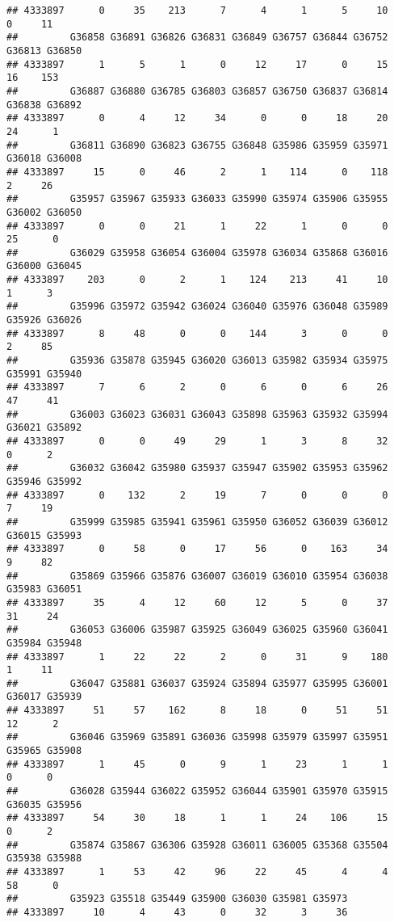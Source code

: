 \documentclass[
]{article}
\begin{document}
\begin{verbatim}
## 4333897      0     35    213      7      4      1      5     10      0     11
##         G36858 G36891 G36826 G36831 G36849 G36757 G36844 G36752 G36813 G36850
## 4333897      1      5      1      0     12     17      0     15     16    153
##         G36887 G36880 G36785 G36803 G36857 G36750 G36837 G36814 G36838 G36892
## 4333897      0      4     12     34      0      0     18     20     24      1
##         G36811 G36890 G36823 G36755 G36848 G35986 G35959 G35971 G36018 G36008
## 4333897     15      0     46      2      1    114      0    118      2     26
##         G35957 G35967 G35933 G36033 G35990 G35974 G35906 G35955 G36002 G36050
## 4333897      0      0     21      1     22      1      0      0     25      0
##         G36029 G35958 G36054 G36004 G35978 G36034 G35868 G36016 G36000 G36045
## 4333897    203      0      2      1    124    213     41     10      1      3
##         G35996 G35972 G35942 G36024 G36040 G35976 G36048 G35989 G35926 G36026
## 4333897      8     48      0      0    144      3      0      0      2     85
##         G35936 G35878 G35945 G36020 G36013 G35982 G35934 G35975 G35991 G35940
## 4333897      7      6      2      0      6      0      6     26     47     41
##         G36003 G36023 G36031 G36043 G35898 G35963 G35932 G35994 G36021 G35892
## 4333897      0      0     49     29      1      3      8     32      0      2
##         G36032 G36042 G35980 G35937 G35947 G35902 G35953 G35962 G35946 G35992
## 4333897      0    132      2     19      7      0      0      0      7     19
##         G35999 G35985 G35941 G35961 G35950 G36052 G36039 G36012 G36015 G35993
## 4333897      0     58      0     17     56      0    163     34      9     82
##         G35869 G35966 G35876 G36007 G36019 G36010 G35954 G36038 G35983 G36051
## 4333897     35      4     12     60     12      5      0     37     31     24
##         G36053 G36006 G35987 G35925 G36049 G36025 G35960 G36041 G35984 G35948
## 4333897      1     22     22      2      0     31      9    180      1     11
##         G36047 G35881 G36037 G35924 G35894 G35977 G35995 G36001 G36017 G35939
## 4333897     51     57    162      8     18      0     51     51     12      2
##         G36046 G35969 G35891 G36036 G35998 G35979 G35997 G35951 G35965 G35908
## 4333897      1     45      0      9      1     23      1      1      0      0
##         G36028 G35944 G36022 G35952 G36044 G35901 G35970 G35915 G36035 G35956
## 4333897     54     30     18      1      1     24    106     15      0      2
##         G35874 G35867 G36306 G35928 G36011 G36005 G35368 G35504 G35938 G35988
## 4333897      1     53     42     96     22     45      4      4     58      0
##         G35923 G35518 G35449 G35900 G36030 G35981 G35973
## 4333897     10      4     43      0     32      3     36
\end{verbatim}
\end{document}
